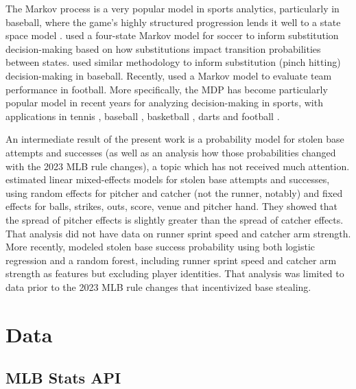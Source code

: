 \documentclass{article}
\begin{document}
    The Markov process is a very popular model in sports analytics, particularly in baseball, where the game's highly structured progression lends it well to a state space model \parencite{bukiet_markov_1997}. \textcite{hirotsu_using_2002} used a four-state Markov model for soccer to inform substitution decision-making based on how substitutions impact transition probabilities between states. \textcite{hirotsu_markov_2003} used similar methodology to inform substitution (pinch hitting) decision-making in baseball. Recently, \textcite{chan_points_2021} used a Markov model to evaluate team performance in football. More specifically, the MDP has become particularly popular model in recent years for analyzing decision-making in sports, with applications in tennis \parencite{nadimpalli_when_2013}, baseball \parencite{hirotsu_using_2019}, basketball \parencite{sandholtz_markov_2020}, darts \parencite{baird_optimising_2020} and football \parencite{biro_reinforcement_2022}.

    An intermediate result of the present work is a probability model for stolen base attempts and successes (as well as an analysis how those probabilities changed with the 2023 MLB rule changes), a topic which has not received much attention. \textcite{loughin_assessing_2008} estimated linear mixed-effects models for stolen base attempts and successes, using random effects for pitcher and catcher (not the runner, notably) and fixed effects for balls, strikes, outs, score, venue and pitcher hand. They showed that the spread of pitcher effects is slightly greater than the spread of catcher effects. That analysis did not have data on runner sprint speed and catcher arm strength. More recently, \textcite{stanley_modeling_2023} modeled stolen base success probability using both logistic regression and a random forest, including runner sprint speed and catcher arm strength as features but excluding player identities. That analysis was limited to data prior to the 2023 MLB rule changes that incentivized base stealing.

  \section{Data}

    \subsection{MLB Stats API}
    \label{sec:statsapi}
\end{document}
